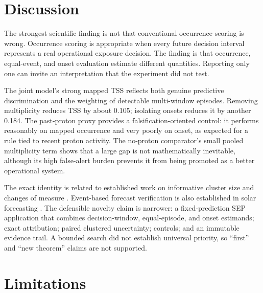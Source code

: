 \documentclass[11pt]{article}
\begin{document}
\section{Discussion}

The strongest scientific finding is not that conventional occurrence scoring is wrong. Occurrence scoring is appropriate when every future decision interval represents a real operational exposure decision. The finding is that occurrence, equal-event, and onset evaluation estimate different quantities. Reporting only one can invite an interpretation that the experiment did not test.

The joint model's strong mapped TSS reflects both genuine predictive discrimination and the weighting of detectable multi-window episodes. Removing multiplicity reduces TSS by about 0.105; isolating onsets reduces it by another 0.184. The past-proton proxy provides a falsification-oriented control: it performs reasonably on mapped occurrence and very poorly on onset, as expected for a rule tied to recent proton activity. The no-proton comparator's small pooled multiplicity term shows that a large gap is not mathematically inevitable, although its high false-alert burden prevents it from being promoted as a better operational system.

The exact identity is related to established work on informative cluster size and changes of measure \cite{nevalainen2014,frank2012}. Event-based forecast verification is also established in solar forecasting \cite{kso2018}. The defensible novelty claim is narrower: a fixed-prediction SEP application that combines decision-window, equal-episode, and onset estimands; exact attribution; paired clustered uncertainty; controls; and an immutable evidence trail. A bounded search did not establish universal priority, so ``first'' and ``new theorem'' claims are not supported.

\section{Limitations}
\end{document}
